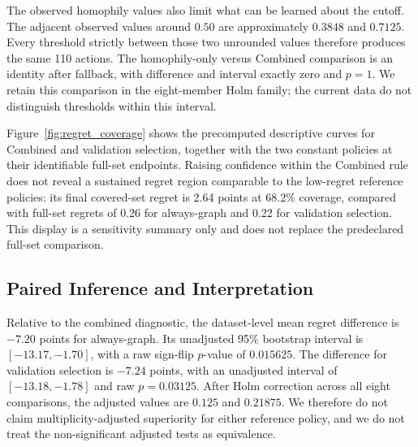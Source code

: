 The observed homophily values also limit what can be learned about the cutoff. The adjacent observed values around $0.50$ are approximately $0.3848$ and $0.7125$. Every threshold strictly between those two unrounded values therefore produces the same 110 actions. The homophily-only versus Combined comparison is an identity after fallback, with difference and interval exactly zero and $p=1$. We retain this comparison in the eight-member Holm family; the current data do not distinguish thresholds within this interval.

Figure~\ref{fig:regret_coverage} shows the precomputed descriptive curves for Combined and validation selection, together with the two constant policies at their identifiable full-set endpoints. Raising confidence within the Combined rule does not reveal a sustained regret region comparable to the low-regret reference policies: its final covered-set regret is 2.64 points at 68.2\% coverage, compared with full-set regrets of 0.26 for always-graph and 0.22 for validation selection. This display is a sensitivity summary only and does not replace the predeclared full-set comparison.

\subsection{Paired Inference and Interpretation}

Relative to the combined diagnostic, the dataset-level mean regret difference is $-7.20$ points for always-graph. Its unadjusted 95\% bootstrap interval is $[-13.17,-1.70]$, with a raw sign-flip $p$-value of $0.015625$. The difference for validation selection is $-7.24$ points, with an unadjusted interval of $[-13.18,-1.78]$ and raw $p=0.03125$. After Holm correction across all eight comparisons, the adjusted values are $0.125$ and $0.21875$. We therefore do not claim multiplicity-adjusted superiority for either reference policy, and we do not treat the non-significant adjusted tests as equivalence.

